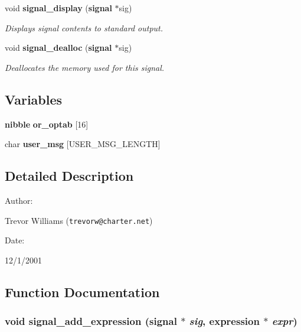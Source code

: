 \begin{CompactItemize}
void {\bf signal\_\-display} ({\bf signal} $\ast$sig)
\begin{CompactList}\small\item\em Displays signal contents to standard output.\item\end{CompactList}\item 
void {\bf signal\_\-dealloc} ({\bf signal} $\ast$sig)
\begin{CompactList}\small\item\em Deallocates the memory used for this signal.\item\end{CompactList}\end{CompactItemize}
\subsection*{Variables}
\begin{CompactItemize}
\item 
{\bf nibble} {\bf or\_\-optab} [16]
\item 
char {\bf user\_\-msg} [USER\_\-MSG\_\-LENGTH]
\end{CompactItemize}


\subsection{Detailed Description}


\begin{Desc}
\item[Author: ]\par
Trevor Williams ({\tt trevorw@charter.net}) \end{Desc}
\begin{Desc}
\item[Date: ]\par
12/1/2001\end{Desc}


\subsection{Function Documentation}
\subsubsection{\setlength{\rightskip}{0pt plus 5cm}void signal\_\-add\_\-expression ({\bf signal} $\ast$ {\em sig}, {\bf expression} $\ast$ {\em expr})}\label{signal_8c_a8}


